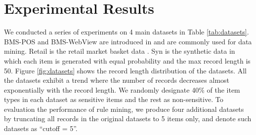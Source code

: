 \section{Experimental Results}
\label{sec:eval}

We conducted a series of experiments on
4 main datasets in Table \ref{tab:datasets}. BMS-POS and BMS-WebView are
introduced in \cite{Zheng:2001:RWP:502512.502572} and are commonly used for
data mining. Retail is the retail market basket data \cite{brijs99:retailData}. Syn is the synthetic data in which each item is generated with 
equal probability and the max record length is 50.
%
Figure \ref{fig:datasets} shows the record length distribution of the datasets.
All the datasets exhibit a trend where the number of records decreases almost exponentially
with the record length.
%
We randomly designate 40\% of the item types in each dataset as
sensitive items and the rest as non-sensitive.
%
To evaluation the performance of rule mining,
we produce four additional datasets by truncating all records in the
original datasets to 5 items only, and denote
such datasets as ``cutoff = 5''.

\begin{table}[tb]
\centering
{}
\end{table}


